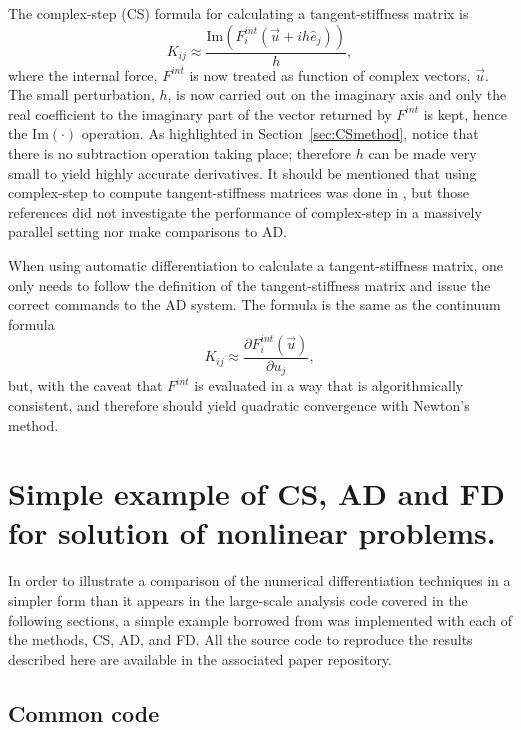 \documentclass[preprint,12pt]{elsarticle}
\begin{document}
The complex-step (CS) formula for calculating a tangent-stiffness matrix is
%
\begin{equation} K_{ij} \approx \frac{\mbox{Im}(F_i^{int}(\vec{u} + i h
\hat{e}_j))}{h}, \end{equation}
%
where the internal force, $F^{int}$ is now treated as function of complex vectors,  $\vec{u}$. The small perturbation, $h$, is now carried out on the imaginary axis and only the real coefficient to the imaginary part of the vector returned by $F^{int}$ is kept, hence the $\mbox{Im}(\cdot)$ operation.  As highlighted in Section~\ref{sec:CSmethod}, notice that there is no subtraction operation taking place; therefore $h$ can be made very small to yield highly accurate derivatives. It should be mentioned that using complex-step to compute tangent-stiffness matrices was done in \cite{perez2000numerical,perez2012numerical}, but those references did not
investigate the performance of complex-step in a massively parallel setting nor make comparisons to AD. 

When using automatic differentiation to calculate a tangent-stiffness matrix, one only needs to follow the definition of the tangent-stiffness matrix and issue the correct commands to the AD system. The formula is the same as the continuum formula
%
\begin{equation} K_{ij} \approx \frac{\partial F_i^{int}(\vec{u})}{\partial u_j},
\end{equation}
%
but, with the caveat that $F^{int}$ is evaluated in a way that is algorithmically consistent, and therefore should yield quadratic convergence with Newton's method.

\section{Simple example of CS, AD and FD for solution of nonlinear problems.}
\label{sec:WorkingExamples}

In order to illustrate a comparison of the numerical differentiation techniques in a simpler form than it appears in the large-scale analysis code covered in the following sections, a simple example borrowed from \cite{rezaiee2010dynamic} was implemented with each of the methods, CS, AD, and FD. All the source code to reproduce the results described here are available in the associated paper repository.

\subsection{Common code} 
\label{subsec:CommonCode} 
\end{document}
